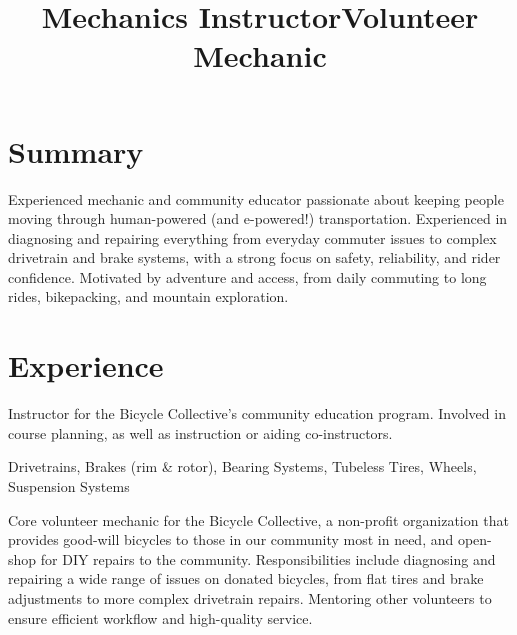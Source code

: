 \documentclass[resmargin, centered, 11pt]{../res}
\begin{document}
\address{\href{mailto:kirkwood.donavin@gmail.com}{Kirkwood.Donavin@Gmail.com}}
\address{+1 (801) 554-6834}
\address{}
\address{}

\begin{resume}
    
\fullline

\section{Summary}

Experienced mechanic and community educator passionate about keeping people moving through human-powered (and e-powered!) transportation. Experienced in diagnosing and repairing everything from everyday commuter issues to complex drivetrain and brake systems, with a strong focus on safety, reliability, and rider confidence. Motivated by adventure and access, from daily commuting to long rides, bikepacking, and mountain exploration.

\fullline

\section{Experience}

\title{Mechanics Instructor}
\begin{position}
	Instructor for the Bicycle Collective's community education program. Involved in course planning, as well as instruction or aiding co-instructors. 
	
	 Drivetrains, Brakes (rim \& rotor), Bearing Systems, Tubeless Tires, Wheels, Suspension Systems
\end{position}

\title{Volunteer Mechanic}
\begin{position}
	Core volunteer mechanic for the Bicycle Collective, a non-profit organization that provides good-will bicycles to those in our community most in need, and open-shop for DIY repairs to the community. Responsibilities include diagnosing and repairing a wide range of issues on donated bicycles, from flat tires and brake adjustments to more complex drivetrain repairs. Mentoring other volunteers to ensure efficient workflow and high-quality service.
\end{position}


\end{resume}
\end{document}
